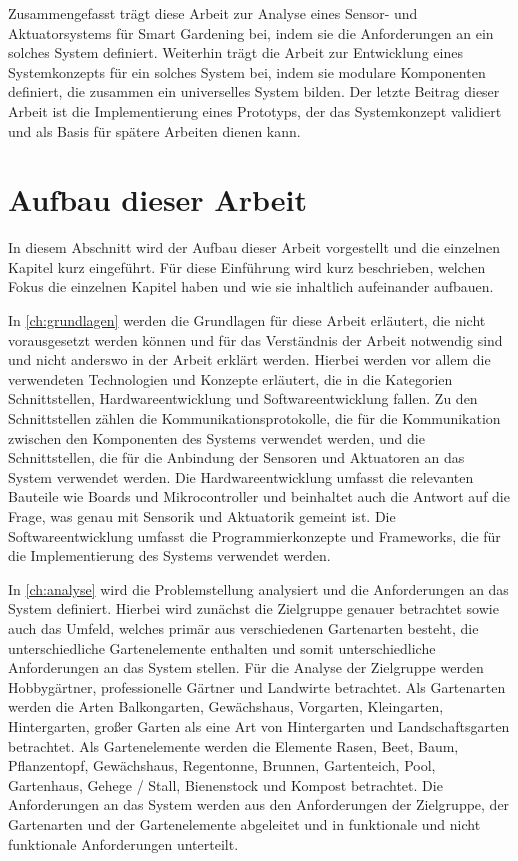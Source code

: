 Zusammengefasst trägt diese Arbeit zur Analyse eines Sensor- und Aktuatorsystems für Smart Gardening bei, indem sie die Anforderungen an ein solches System definiert.
Weiterhin trägt die Arbeit zur Entwicklung eines Systemkonzepts für ein solches System bei, indem sie modulare Komponenten definiert, die zusammen ein universelles System bilden.
Der letzte Beitrag dieser Arbeit ist die Implementierung eines Prototyps, der das Systemkonzept validiert und als Basis für spätere Arbeiten dienen kann.



\section{Aufbau dieser Arbeit}
In diesem Abschnitt wird der Aufbau dieser Arbeit vorgestellt und die einzelnen Kapitel kurz eingeführt.
Für diese Einführung wird kurz beschrieben, welchen Fokus die einzelnen Kapitel haben und wie sie inhaltlich aufeinander aufbauen.

In \cref{ch:grundlagen} werden die Grundlagen für diese Arbeit erläutert, die nicht vorausgesetzt werden können und für das Verständnis der Arbeit notwendig sind und nicht anderswo in der Arbeit erklärt werden.
Hierbei werden vor allem die verwendeten Technologien und Konzepte erläutert, die in die Kategorien Schnittstellen, Hardwareentwicklung und Softwareentwicklung fallen.
Zu den Schnittstellen zählen die Kommunikationsprotokolle, die für die Kommunikation zwischen den Komponenten des Systems verwendet werden, und die Schnittstellen, die für die Anbindung der Sensoren und Aktuatoren an das System verwendet werden.
Die Hardwareentwicklung umfasst die relevanten Bauteile wie Boards und Mikrocontroller und beinhaltet auch die Antwort auf die Frage, was genau mit Sensorik und Aktuatorik gemeint ist.
Die Softwareentwicklung umfasst die Programmierkonzepte und Frameworks, die für die Implementierung des Systems verwendet werden.

In \cref{ch:analyse} wird die Problemstellung analysiert und die Anforderungen an das System definiert.
Hierbei wird zunächst die Zielgruppe genauer betrachtet sowie auch das Umfeld, welches primär aus verschiedenen Gartenarten besteht, die unterschiedliche Gartenelemente enthalten und somit unterschiedliche Anforderungen an das System stellen.
Für die Analyse der Zielgruppe werden Hobbygärtner, professionelle Gärtner und Landwirte betrachtet.
Als Gartenarten werden die Arten Balkongarten, Gewächshaus, Vorgarten, Kleingarten, Hintergarten, großer Garten als eine Art von Hintergarten und Landschaftsgarten betrachtet.
Als Gartenelemente werden die Elemente Rasen, Beet, Baum, Pflanzentopf, Gewächshaus, Regentonne, Brunnen, Gartenteich, Pool, Gartenhaus, Gehege / Stall, Bienenstock und Kompost betrachtet.
Die Anforderungen an das System werden aus den Anforderungen der Zielgruppe, der Gartenarten und der Gartenelemente abgeleitet und in funktionale und nicht funktionale Anforderungen unterteilt.

